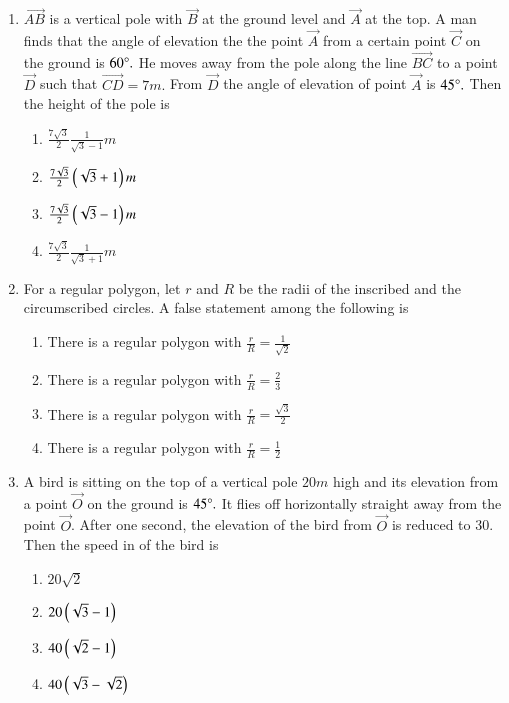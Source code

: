 \documentclass[journal]{IEEEtran}
\theoremstyle{remark}
\begin{document}
\begin{enumerate}
\item $\vec{AB}$ is a vertical pole with $\vec{B}$ at the ground level and $\vec{A}$ at the top. A man finds that the angle of elevation the the point $\vec{A}$ from a certain point $\vec{C}$ on the ground is $60\degree.$ He moves away from the pole along the line $\vec{BC}$ to a point $\vec{D}$ such that $\vec{CD}=7m.$ From $\vec{D}$ the angle of elevation of point $\vec{A}$ is $45\degree.$ Then the height of the pole is  

\hfill{}
\begin{multicols}{4}
\begin{enumerate}
        \item $\frac{7\sqrt{3}}{2}\frac{1}{\sqrt{3}-1}m$          
        \item $\frac{7\sqrt{3}}{2}\left(\sqrt{3}+1\right)m$ 
        \item $\frac{7\sqrt{3}}{2}\left(\sqrt{3}-1\right)m$ 
        \item $\frac{7\sqrt{3}}{2}\frac{1}{\sqrt{3}+1}m$
\end{enumerate}
\end{multicols} 

\item For a regular polygon, let $r$ and $R$ be the radii of the inscribed and the circumscribed circles. A false statement among the following is \hfill{}
\begin{enumerate}
        \item There is a regular polygon with $\frac{r}{R}=\frac{1}{\sqrt{2}}$                    
        \item There is a regular polygon with $\frac{r}{R}=\frac{2}{3}$ 
        \item There is a regular polygon with $\frac{r}{R}=\frac{\sqrt{3}}{2}$ 
        \item There is a regular polygon with $\frac{r}{R}=\frac{1}{2}$
\end{enumerate}

\item A bird is sitting on the top of a vertical pole $20m$ high and its elevation from a point $\vec{O}$ on the  ground is $45\degree.$ It flies off horizontally straight away from the point $\vec{O}$. After one second, the elevation of the bird from $\vec{O}$ is reduced to {30\degree.} Then the speed in  of the bird is \hfill{}
\begin{multicols}{4}
\begin{enumerate}
        \item $20\sqrt{2}$                    
        \item $20\left(\sqrt{3}-1\right)$ 
        \item $40\left(\sqrt{2}-1\right)$ 
        \item $40\left(\sqrt{3}-\sqrt{2}\right)$
\end{enumerate}
\end{multicols} 


\end{enumerate}
\end{document}
